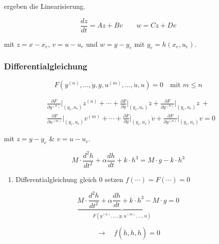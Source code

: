 \documentclass[
  10pt,
  a4paper,
]{article}
\providecommand{\tightlist}{%
  \setlength{\itemsep}{0pt}\setlength{\parskip}{0pt}}\usepackage{longtable,booktabs,array}
\numberwithin{equation}{section}
\begin{document}
\begin{multicols}{2}
ergeben die Linearisierung.

\[
\frac{dz}{dt}=Az+Bv\qquad w=Cz+Dv
\]

mit \(z=x-x_e\), \(v=u-u_e\) und \(w=y-y_e\) mit \(y_e=h(x_e,u_e)\).

\hypertarget{differentialgleichung}{%
\subsubsection{Differentialgleichung}\label{differentialgleichung}}

\[
F(y^{(n)},\ldots,\dot{y},y,u^{(m)},\ldots,\dot{u},u)=0\quad\text{mit } m\leq n
\]

\[
\begin{split} 
&\frac{\partial{F}}{\partial{y^{(n)}}}\biggr\rvert_{(y_e,u_e)} z^{(n)}+ 
 \cdots+ 
 \frac{\partial{F}}{\partial{\dot{y}}}\biggr\rvert_{(y_e,u_e)} \dot{z}+ 
 \frac{\partial{F}}{\partial{y^{(n)}}}\biggr\rvert_{(y_e,u_e)} z\ + \\
&\frac{\partial{F}}{\partial{u^{(m)}}}\biggr\rvert_{(y_e,u_e)} v^{(m)}+
 \cdots+ 
 \frac{\partial{F}}{\partial{\dot{y}}}\biggr\rvert_{(y_e,u_e)} \dot{v}+
 \frac{\partial{F}}{\partial{y^{(n)}}}\biggr\rvert_{(y_e,u_e)} v = 0 
\end{split}
\]

mit \(z=y-y_e\) \& \(v=u-u_e\).

\begin{tcolorbox}[enhanced jigsaw, coltitle=black, arc=.35mm, breakable, opacityback=0, opacitybacktitle=0.6, rightrule=.15mm, titlerule=0mm, bottomrule=.15mm, leftrule=.75mm, bottomtitle=1mm, colframe=quarto-callout-tip-color-frame, toprule=.15mm, colbacktitle=quarto-callout-tip-color!10!white, toptitle=1mm, title=\textcolor{quarto-callout-tip-color}{\faLightbulb}\hspace{0.5em}{Vorgehen}, left=2mm, colback=white]

\[
M\cdot \frac{d^2h}{dt^2}+\alpha\frac{dh}{dt}+k\cdot h^3 = M\cdot g-k\cdot h^3
\]

\begin{enumerate}
\def\labelenumi{\arabic{enumi}.}
\tightlist
\item
  Differentialgleichung gleich \(0\) setzen \(f(\cdots)=F(\cdots)=0\)
\end{enumerate}

\[
\underbrace{M\cdot \frac{d^2h}{dt^2}+\alpha\frac{dh}{dt}+k\cdot h^3 - M\cdot g}_{F(y^{(n)},\ldots,y,u^{(m)},\ldots,u)}=0
\]

\[
\rightarrow\quad f(\ddot{h}, \dot{h}, h)= 0
\]


\end{tcolorbox}
\end{multicols}
\end{document}
